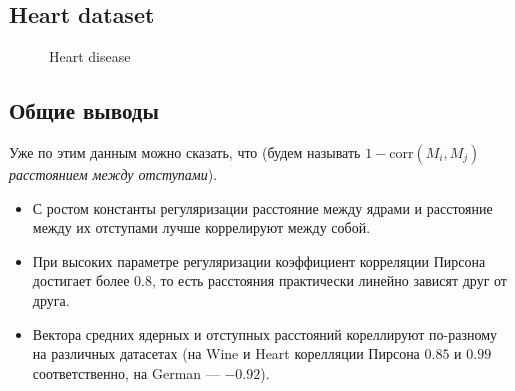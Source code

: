 \documentclass[12pt,twoside]{article}
\begin{document}



\newpage

\subsection{Heart dataset}

\begin{figure}[H]
      \caption{Heart disease}
\end{figure}



\subsection{Общие выводы}

Уже по этим данным можно сказать, что (будем называть $1 - \mathrm{corr}(M_i, M_j)$ 
\emph{расстоянием между отступами}).
\begin{itemize}
  \item С ростом константы регуляризации расстояние между ядрами и расстояние между
  их отступами лучше коррелируют между собой.
  \item При высоких параметре регуляризации коэффициент корреляции Пирсона 
  достигает более $0.8$, то есть расстояния практически линейно зависят друг от друга.
  \item Вектора средних ядерных и отступных расстояний кореллируют по-разному на различных датасетах (на Wine и Heart корелляции Пирсона $0.85$ и $0.99$ соответственно, на German --- $-0.92$).
\end{itemize} 






\end{document}
